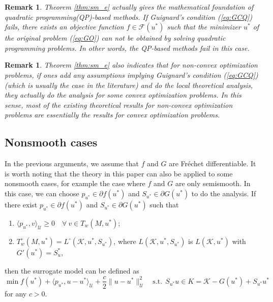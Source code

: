 \documentclass[leqno]{amsart}
\newtheorem{Remark}[Theorem]{Remark}
\theoremstyle{definition}
\begin{document}
\begin{Remark}
Theorem \ref{thm:sm_e} actually gives the mathematical foundation of quadratic programming(QP)-based methods. If Guignard's condition (\ref{eq:GCQ}) fails, there exists an objective function $f\in \mathcal{F}(u^*)$ such that the minimizer $u^*$ of the original problem (\ref{eq:GO}) can not be obtained by solving quadratic programming problems. In other words, the QP-based methods fail in this case.
\end{Remark}

\begin{Remark}
Theorem \ref{thm:sm_e} also indicates that for non-convex optimization problems, if ones add any assumptions implying Guignard's condition (\ref{eq:GCQ}) (which is usually the case in the literature) and do the local theoretical analysis, they actually do the analysis for some convex optimization problems. In this sense, most of the existing theoretical results for non-convex optimization problems are essentially the results for convex optimization problems.
\end{Remark}

\subsection{Nonsmooth cases} In the previous arguments, we assume that $f$ and $G$ are Fr\'{e}chet differentiable. It is worth noting that the theory in this paper can also be applied to some nonsmooth cases, for example the case where $f$ and $G$ are only semismooth. In this case, we can choose $p_{u^*}\in \partial f(u^*)$ and $S_{u^*}\in \partial G(u^*)$ to do the analysis. If there exist $p_{u^*}\in \partial f(u^*)$ and $S_{u^*}\in \partial G(u^*)$ such that
\begin{enumerate}[(1)]
\item $\langle p_{u^*}, v\rangle_\mathcal{U}\geq 0\quad \forall\ v\in T_w(M,u^*)$;

\item $T_w^\circ(M,u^*) = L^\circ(\mathcal{K}, u^*, S_{u^*})$, where $L(\mathcal{K}, u^*, S_{u^*})$ is $L(\mathcal{K}, u^*)$ with $G'(u^*) = S_u^*$,
\end{enumerate}
then the surrogate model can be defined as
\begin{equation}\nonumber
\min f(u^*) + \langle p_{u^*}, u - u^*\rangle_{\mathcal{U}} + \frac{c}{2}\|u - u^*\|_{\mathcal{U}}^2 \quad \mbox{s.t.}\ \  S_{u^*}u \in K = \mathcal{K} - G(u^*) + S_{u^*}u^*
\end{equation}
for any $c>0$.
\end{document}
